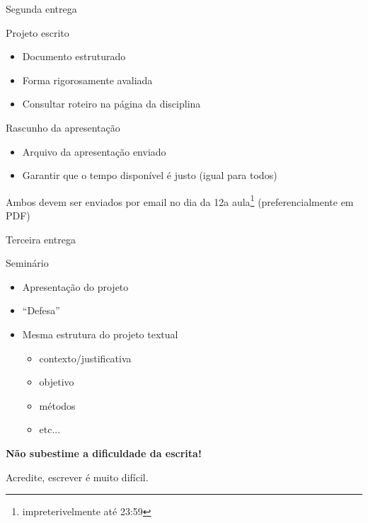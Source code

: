 \documentclass{beamer}
\begin{document}
\begin{frame}{Segunda entrega}
  \small
  \begin{block}{Projeto escrito}
    \begin{itemize}
    \item Documento estruturado
    \item Forma rigorosamente avaliada
    \item Consultar roteiro na página da disciplina
    \end{itemize}
  \end{block}
  \begin{block}{Rascunho da apresentação}
    \begin{itemize}
    \item Arquivo da apresentação enviado
    \item Garantir que o tempo disponível é justo (igual para todos)
    \end{itemize}
  \end{block}
  Ambos devem ser enviados por email no dia da 12a aula\footnote{impreterivelmente até 23:59} (preferencialmente em PDF)
\end{frame}

\begin{frame}{Terceira entrega}
  \begin{block}{Seminário}
    \begin{itemize}
    \item Apresentação do projeto
    \item ``Defesa''
    \item Mesma estrutura do projeto textual
      \begin{itemize}
      \item contexto/justificativa
      \item objetivo
      \item métodos
      \item etc...
      \end{itemize}
    \end{itemize}
  \end{block}
\end{frame}


\begin{frame}{}
  \begin{block}{}
    {\bf Não subestime a dificuldade da escrita!}

    Acredite, escrever é muito difícil.
  \end{block}

  \bigskip
  \bigskip
\end{frame}
\end{document}
